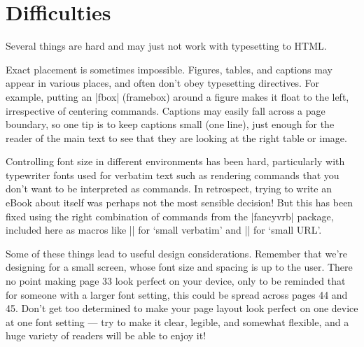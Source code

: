 \section{Difficulties}

Several things are hard and may just not work with typesetting to HTML.

Exact placement is sometimes impossible. Figures, tables, and captions may appear
in various places, and often don't obey typesetting directives. For example,
putting an \sverb|fbox| (framebox) around a figure makes it float to the left, irrespective of
centering commands. Captions may easily fall across
a page boundary, so one tip is to keep captions small (one line), just enough for the reader
of the main text to see that they are looking at the right table or image.

Controlling font size in different environments has been hard, particularly with typewriter fonts
used for verbatim text such as rendering \latex commands that you don't want to be interpreted as
\latex commands. In retrospect, trying to write an eBook about \latex itself was perhaps not the
most sensible decision! But this has been fixed using the right combination of commands from the
\sverb|fancyvrb| package, included here as macros like \sverb|\sverb| for `small verbatim' and
\sverb|\surl| for `small URL'.

Some of these things lead to useful design considerations.
Remember that we're designing for a small screen, whose font size and spacing is up to the user. 
There no point making page 33 look perfect on your device,
only to be reminded that for someone with a larger font setting, this could be spread across
pages 44 and 45. Don't get too determined to make your page layout
look perfect on one device at one font setting --- try to make it clear, legible,
and somewhat flexible, and a huge variety of readers will be able to enjoy it!

